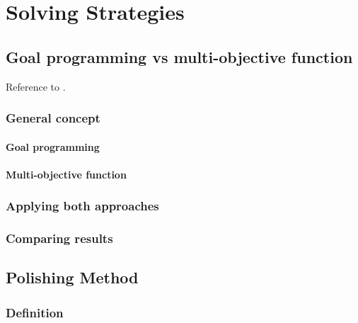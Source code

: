 \chapter{Solving Strategies}
\label{chap:strategies}


\section{Goal programming vs multi-objective function}

Reference to \cite{Guenalay2006}.

\subsection{General concept}

\subsubsection{Goal programming}

\subsubsection{Multi-objective function}


\subsection{Applying both approaches}


\subsection{Comparing results}



\section{Polishing Method}

\subsection{Definition}

